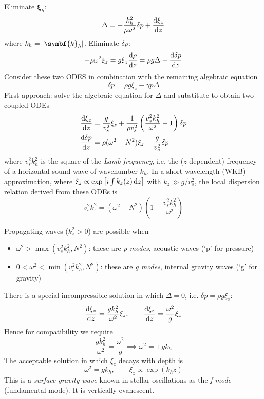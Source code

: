 \documentclass{jknotes}
\newcommand{\disp}{\symbf{\xi}}
\begin{document}
Eliminate $\disp_h$:
\begin{equation}
	\Delta = -\frac{k_h^2}{\rho \omega^2} \delta p + \frac{\diffd
	\xi_z}{\diffd z}
\end{equation}
where $k_h = \abs{\symbf{k}_h}$. Eliminate $\delta \rho$:
\begin{equation}
	-\rho \omega^2 \xi_z = g \xi_z \frac{\diffd \rho}{\diffd z} = \rho g
	\Delta - \frac{\diffd \delta p}{\diffd z}
\end{equation}
Consider these two ODES in combination with the remaining algebraic equation
\begin{equation}
	\delta p = \rho g \xi_z - \gamma p \Delta
\end{equation}
First approach: solve the algebraic equation for $\Delta$ and substitute to
obtain two coupled ODEs
\begin{align}
	\frac{\diffd \xi_z}{\diffd z} &= \frac{g}{v_s^2} \xi_z + \frac{1}{\rho
	v_s^2} \left( \frac{v_s^2 k_h^2}{\omega^2} - 1\right) \delta p \\
	\frac{\diffd \delta p}{\diffd z} &= \rho (\omega^2 - N^2) \xi_z -
	\frac{g}{v_s^2} \delta p
\end{align}
where $v_s^2 k_h^2$ is the square of the \emph{Lamb frequency}, i.e. the
($z$-dependent) frequency of a horizontal sound wave of wavenumber $k_h$. In a
short-wavelength (WKB) approximation, where $\xi_z \propto \exp\left[i\int
k_z(z)\,\diffd z\right]$ with $k_z \gg g/v_s^2$, the local dispersion relation
derived from these ODEs is
\begin{equation}
	v_s^2 k_z^2 = (\omega^2 - N^2)\left(1-\frac{v_s^2 k_h^2}{\omega^2}\right)
\end{equation}

Propagating waves ($k_z^2 > 0$) are possible when
\begin{itemize}
	\item $\omega^2 > \max(v_s^2 k_h^2, N^2)$: these are \emph{p modes},
		acoustic waves (`p' for pressure)
	\item $0 < \omega^2 < \min(v_s^2 k_h^2, N^2)$: these are \emph{g modes},
		internal gravity waves (`g' for gravity)
\end{itemize}
There is a special incompressible solution in which $\Delta = 0$, i.e. $\delta
p = \rho g \xi_z$:
\begin{equation}
	\frac{\diffd \xi_z}{\diffd z} = \frac{gk_h^2}{\omega^2} \xi_z,
	\hspace{2em} \frac{\diffd \xi_z}{\diffd z} = \frac{\omega^2}{g}\xi_z
\end{equation}
Hence for compatibility we require
\begin{equation}
	\frac{gk_h^2}{\omega^2} = \frac{\omega^2}{g} \implies \omega^2 = \pm gk_h
\end{equation}
The acceptable solution in which $\xi_z$ decays with depth is
\begin{equation}
	\omega^2 = gk_h, \hspace{2em} \xi_z \propto \exp(k_h z)
\end{equation}
This is a \emph{surface gravity wave} known in stellar oscillations as the
\emph{f mode} (fundamental mode). It is vertically evanescent.
\end{document}
